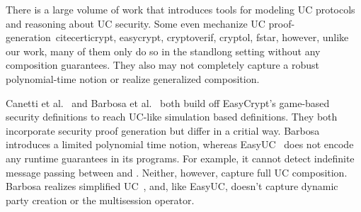There is a large volume of work that introduces tools for modeling UC protocols and reasoning about UC security.
Some even mechanize UC proof-generation~cite{certicrypt, easycrypt, cryptoverif, cryptol, fstar}, however, unlike our work, many of them only do so in the standlong setting without any composition guarantees. They also may not completely capture a robust polynomial-time notion or realize generalized composition. 

Canetti et al.~\cite{easyuc} and Barbosa et al.~\cite{barbosa} both build off EasyCrypt's game-based security definitions to reach UC-like simulation based definitions.
They both incorporate security proof generation but differ in a critial way.
Barbosa introduces a limited polynomial time notion, whereas EasyUC~\cite{easyuc} does not encode any runtime guarantees in its programs. 
For example, it cannot detect indefinite message passing between \A and \F. Neither, however, capture full UC composition.
Barbosa realizes simplified UC~\cite{suc}, and, like EasyUC, doesn't capture dynamic party creation or the multisession operator.

%

